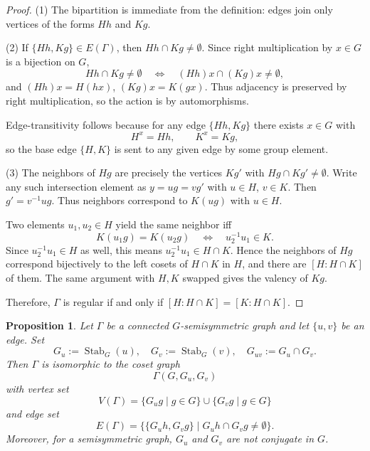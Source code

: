 \documentclass[12pt,a4paper,openany]{book}
\newtheorem{proposition}{Proposition}[section]
\begin{document}
\begin{proof}
(1) The bipartition is immediate from the definition: edges join only vertices of the forms
$Hh$ and $Kg$.

(2) If $\{Hh, Kg\} \in E(\Gamma)$, then $Hh \cap Kg \neq \emptyset$. Since right multiplication by $x \in G$ is a bijection on $G$,
\[
Hh \cap Kg \neq \emptyset
\quad \Longleftrightarrow \quad
(Hh)x \cap (Kg)x \neq \emptyset,
\]
and $(Hh)x = H(hx)$, $(Kg)x = K(gx)$. Thus adjacency is preserved by right multiplication, 
so the action is by automorphisms.

Edge-transitivity follows because for any edge $\{Hh, Kg\}$ there exists $x \in G$ with
\[
H^x = Hh, \qquad K^x = Kg,
\]
so the base edge $\{H, K\}$ is sent to any given edge by some group element.

(3) The neighbors of $H g$ are precisely the vertices $K g'$ with $H g \cap K g' \neq \emptyset$.
Write any such intersection element as $y = u g = v g'$ with $u \in H$, $v \in K$. 
Then $g' = v^{-1} u g$. Thus neighbors correspond to $K (u g)$ with $u \in H$.

Two elements $u_1, u_2 \in H$ yield the same neighbor iff
\[
K(u_1 g) = K(u_2 g) 
\quad \Longleftrightarrow \quad 
u_2^{-1} u_1 \in K.
\]
Since $u_2^{-1} u_1 \in H$ as well, this means $u_2^{-1} u_1 \in H \cap K$. 
Hence the neighbors of $H g$ correspond bijectively to the left cosets of $H \cap K$ in $H$, 
and there are $[H : H \cap K]$ of them. The same argument with $H, K$ swapped gives the valency 
of $K g$.

Therefore, $\Gamma$ is regular if and only if $[H : H \cap K] = [K : H \cap K]$.
\end{proof}

\begin{proposition}\label{semi-coset}
Let $\Gamma$ be a connected $G$-semisymmetric graph and let $\{u,v\}$ be an edge. 
Set
\[
G_u := \operatorname{Stab}_G(u),\quad G_v := \operatorname{Stab}_G(v),\quad G_{uv} := G_u \cap G_v.
\]
Then $\Gamma$ is isomorphic to the coset graph
\[
\Gamma(G,G_u,G_v)
\]
with vertex set
\[
V(\Gamma) = \{G_u g \mid g\in G\} \cup \{G_v g \mid g\in G\}
\]
and edge set
\[
E(\Gamma) = \bigl\{ \{G_u h, G_v g\} \mid G_u h \cap G_v g \neq \emptyset \bigr\}.
\]
Moreover, for a semisymmetric graph, $G_u$ and $G_v$ are not conjugate in $G$.
\end{proposition}
\end{document}
